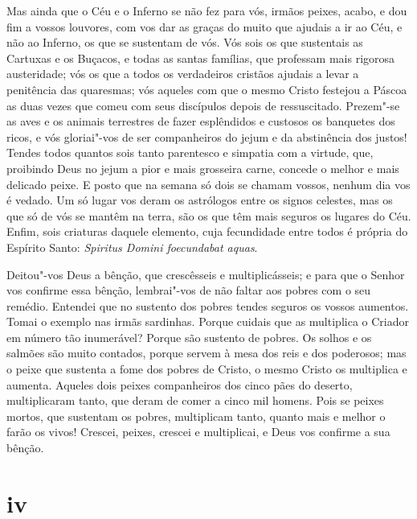 Mas ainda que o Céu e o Inferno se não fez para vós, irmãos peixes,
acabo, e dou fim a vossos louvores, com vos dar as graças do muito que
ajudais a ir ao Céu, e não ao Inferno, os que se sustentam de vós. Vós
sois os que sustentais as Cartuxas e os Buçacos, e todas as santas
famílias, que professam mais rigorosa austeridade; vós os que a todos os
verdadeiros cristãos ajudais a levar a penitência das quaresmas; vós
aqueles com que o mesmo Cristo festejou a Páscoa as duas vezes que comeu
com seus discípulos depois de ressuscitado. Prezem"-se as aves e os
animais terrestres de fazer esplêndidos e custosos os banquetes dos
ricos, e vós gloriai"-vos de ser companheiros do jejum e da abstinência
dos justos! Tendes todos quantos sois tanto parentesco e simpatia com a
virtude, que, proibindo Deus no jejum a pior e mais grosseira carne,
concede o melhor e mais delicado peixe. E posto que na semana só dois se
chamam vossos, nenhum dia vos é vedado. Um só lugar vos deram os
astrólogos entre os signos celestes, mas os que só de vós se mantêm na
terra, são os que têm mais seguros os lugares do Céu. Enfim, sois
criaturas daquele elemento, cuja fecundidade entre todos é própria do
Espírito Santo: \emph{Spiritus Domini foecundabat aquas}.

Deitou"-vos Deus a bênção, que crescêsseis e multiplicásseis; e para que
o Senhor vos confirme essa bênção, lembrai"-vos de não faltar aos pobres
com o seu remédio. Entendei que no sustento dos pobres tendes seguros os
vossos aumentos. Tomai o exemplo nas irmãs sardinhas. Porque cuidais que
as multiplica o Criador em número tão inumerável? Porque são sustento de
pobres. Os solhos e os salmões são muito contados, porque servem à mesa
dos reis e dos poderosos; mas o peixe que sustenta a fome dos pobres de
Cristo, o mesmo Cristo os multiplica e aumenta. Aqueles dois peixes
companheiros dos cinco pães do deserto, multiplicaram tanto, que deram
de comer a cinco mil homens. Pois se peixes mortos, que sustentam os
pobres, multiplicam tanto, quanto mais e melhor o farão os vivos!
Crescei, peixes, crescei e multiplicai, e Deus vos confirme a sua
bênção.

\section*{iv}


